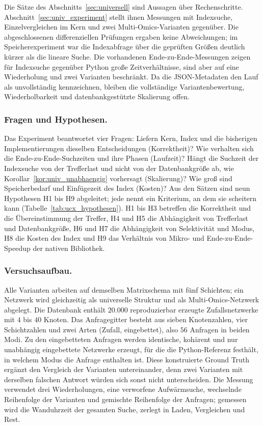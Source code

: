 \documentclass[a4paper,12pt, twoside]{report}
\theoremstyle{definition}
\begin{document}
Die Sätze des Abschnitts~\ref{sec:universell} sind Aussagen über Rechenschritte. Abschnitt~\ref{sec:univ_experiment} stellt ihnen Messungen mit Indexsuche, Einzelvergleichen im Kern und zwei Multi-Omics-Varianten gegenüber. Die abgeschlossenen differenziellen Prüfungen ergaben keine Abweichungen; im Speicherexperiment war die Indexabfrage über die geprüften Größen deutlich kürzer als die lineare Suche. Die vorhandenen Ende-zu-Ende-Messungen zeigen für Indexsuche gegenüber Python große Zeitverhältnisse, sind aber auf eine Wiederholung und zwei Varianten beschränkt. Da die JSON-Metadaten den Lauf als unvollständig kennzeichnen, bleiben die vollständige Variantenbewertung, Wiederholbarkeit und datenbankgestützte Skalierung offen.

\subsubsection{Fragen und Hypothesen.} Das Experiment beantwortet vier Fragen: Liefern Kern, Index und die bisherigen Implementierungen dieselben Entscheidungen (Korrektheit)? Wie verhalten sich die Ende-zu-Ende-Suchzeiten und ihre Phasen (Laufzeit)? Hängt die Suchzeit der Indexsuche von der Trefferlast und nicht von der Datenbankgröße ab, wie Korollar~\ref{kor:univ_unabhaengig} vorhersagt (Skalierung)? Wie groß sind Speicherbedarf und Einfügezeit des Index (Kosten)? Aus den Sätzen sind neun Hypothesen H1 bis H9 abgeleitet; jede nennt ein Kriterium, an dem sie scheitern kann (Tabelle~\ref{tab:ucx_hypothesen}). H1 bis H3 betreffen die Korrektheit und die Übereinstimmung der Treffer, H4 und H5 die Abhängigkeit von Trefferlast und Datenbankgröße, H6 und H7 die Abhängigkeit von Selektivität und Modus, H8 die Kosten des Index und H9 das Verhältnis von Mikro- und Ende-zu-Ende-Speedup der nativen Bibliothek.

\subsubsection{Versuchsaufbau.} Alle Varianten arbeiten auf demselben Matrixschema mit fünf Schichten; ein Netzwerk wird gleichzeitig als universelle Struktur und als Multi-Omics-Netzwerk abgelegt. Die Datenbank enthält $20.000$ reproduzierbar erzeugte Zufallsnetzwerke mit $4$ bis $40$ Knoten. Das Anfragegitter besteht aus sieben Knotenzahlen, vier Schichtzahlen und zwei Arten (Zufall, eingebettet), also $56$ Anfragen in beiden Modi. Zu den eingebetteten Anfragen werden identische, kohärent und nur unabhängig eingebettete Netzwerke erzeugt, für die die Python-Referenz festhält, in welchem Modus die Anfrage enthalten ist. Diese konstruierte Ground Truth ergänzt den Vergleich der Varianten untereinander, denn zwei Varianten mit derselben falschen Antwort würden sich sonst nicht unterscheiden. Die Messung verwendet drei Wiederholungen, eine verworfene Aufwärmsuche, wechselnde Reihenfolge der Varianten und gemischte Reihenfolge der Anfragen; gemessen wird die Wanduhrzeit der gesamten Suche, zerlegt in Laden, Vergleichen und Rest.
\end{document}

